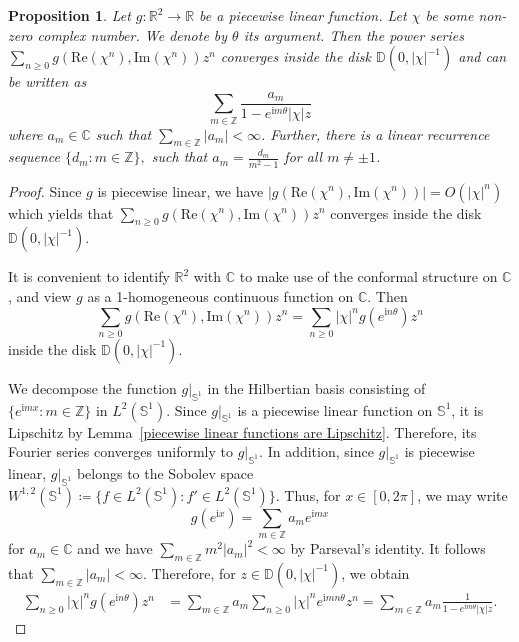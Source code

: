 \documentclass[10pt,a4paper]{amsart}
\newtheorem{proposition}{Proposition}
\newcommand{\irm}{\mathrm{i}}
\begin{document}
\begin{proposition}\label{Fourier coefficients of continuous piecewise linear functions}
     Let $g\colon \mathbb R^2\rightarrow \mathbb R$ be a piecewise linear function. Let $\chi$ be some non-zero complex number. We denote by $\theta$ its argument. Then the power series $\sum_{n\geq0}g(\mathrm{Re}(\chi^n),\mathrm{Im}(\chi^n))z^n$ converges inside the disk $\mathbb D(0,|\chi|^{-1})$ and can be written as 
     $$\sum_{m\in\mathbb Z}\frac{a_m}{1-e^
    {\irm m\theta}|\chi|z}$$
     where $a_m\in\mathbb C$ such that $\sum_{m\in\mathbb Z}|a_m|<\infty$. Further, there is a linear recurrence sequence $\{d_m:m\in\mathbb Z\},$ such that $a_m=\frac{d_m}{m^2-1}$ for all $m\neq\pm1$. \end{proposition}

\begin{proof} 
  Since $g$ is piecewise linear, we have $|g(\mathrm{Re}(\chi^n),\mathrm{Im}(\chi^n))|= O(|\chi|^n)$ which yields that $\sum_{n\geq0}g(\mathrm{Re}(\chi^n),\mathrm{Im}(\chi^n))z^n$ converges inside the disk $\mathbb D(0,|\chi|^{-1})$. 
  
  It is convenient to identify $\mathbb R^2$ with $\mathbb C$ to make use of the conformal structure on $\mathbb C$, and view $g$ as a  1-homogeneous continuous function on $\mathbb C$. Then  $$\sum_{n\geq0}g(\mathrm{Re}(\chi^n),\mathrm{Im}(\chi^n))z^n=\sum_{n\geq0}|\chi|^ng(e^{\irm n\theta})z^n$$
   inside the disk $\mathbb D(0,|\chi|^{-1}).$

We decompose the function $g|_{\mathbb S^1}$ in the Hilbertian basis consisting of $\{e^{\irm mx}:m\in\mathbb Z\}$ in $L^2(\mathbb S^1)$. Since $g|_{\mathbb S^1}$ is a piecewise linear function on $\mathbb S^1$, it is Lipschitz by Lemma~\ref{piecewise linear functions are Lipschitz}. Therefore, its Fourier series converges uniformly to $g|_{\mathbb S^1}$. In addition, since $g|_{\mathbb S^1}$ is piecewise linear, $g|_{\mathbb S^1}$ belongs to the Sobolev space $W^{1,2}(\mathbb S^1)\coloneqq \{f\in L^2(\mathbb S^1):f'\in L^2(\mathbb S^1) \}$. Thus, for $x\in[0,2\pi]$, we may write $$g(e^{\irm  x})=\sum_{m\in\mathbb Z}a_{m}e^{\irm mx}$$
for $a_m\in\mathbb C$ and we have $\sum_{m\in\mathbb Z}m^2|a_m|^2<\infty$ by Parseval's identity. It follows that $\sum_{m\in\mathbb Z}|a_m|<\infty$. Therefore, for $z\in\mathbb{D}(0,|\chi|^{-1})$, we obtain
\begin{align*}
    \sum_{n\geq0}|\chi|^ng(e^{\irm n\theta})z^n&=\sum_{m\in\mathbb Z}a_m\sum_{n\geq0}|\chi|^ne^{\irm mn\theta}z^n=\sum_{m\in\mathbb Z}a_m\frac{1}{1-e^
    {\irm m\theta}|\chi|z}.
\end{align*} 


\end{proof}
\end{document}
